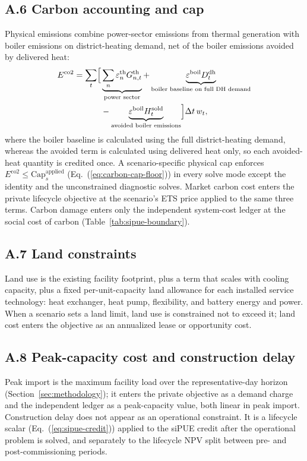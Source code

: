 \documentclass[preprint,12pt]{elsarticle}
\begin{document}
\subsection*{A.6 Carbon accounting and cap}
Physical emissions combine power-sector emissions from thermal generation with boiler emissions on district-heating demand, net of the boiler emissions avoided by delivered heat:
\begin{equation}
\begin{aligned}
E^{\text{co2}} = \sum_t \Bigl[
&\underbrace{\sum_n \varepsilon^{\text{th}}_n G^{\text{th}}_{n,t}}_{\text{power sector}}
+ \underbrace{\varepsilon^{\text{boil}} D^{\text{dh}}_t}_{\text{boiler baseline on full DH demand}} \\
&- \underbrace{\varepsilon^{\text{boil}} H^{\text{sold}}_t}_{\text{avoided boiler emissions}}
\Bigr] \Delta t\, w_t,
\end{aligned}
\label{eq:emissions}
\end{equation}
where the boiler baseline is calculated using the full district-heating demand, whereas the avoided term is calculated using delivered heat only, so each avoided-heat quantity is credited once. A scenario-specific physical cap enforces $E^{\text{co2}}\le \text{Cap}^{\text{applied}}_s$ (Eq.~(\ref{eq:carbon-cap-floor})) in every solve mode except the identity and the unconstrained diagnostic solves. Market carbon cost enters the private lifecycle objective at the scenario's ETS price applied to the same three terms. Carbon damage enters only the independent system-cost ledger at the social cost of carbon (Table~\ref{tab:sipue-boundary}).

\subsection*{A.7 Land constraints}
Land use is the existing facility footprint, plus a term that scales with cooling capacity, plus a fixed per-unit-capacity land allowance for each installed service technology: heat exchanger, heat pump, flexibility, and battery energy and power. When a scenario sets a land limit, land use is constrained not to exceed it; land cost enters the objective as an annualized lease or opportunity cost.

\subsection*{A.8 Peak-capacity cost and construction delay}
Peak import is the maximum facility load over the representative-day horizon (Section~\ref{sec:methodology}); it enters the private objective as a demand charge and the independent ledger as a peak-capacity value, both linear in peak import. Construction delay does not appear as an operational constraint. It is a lifecycle scalar (Eq.~(\ref{eq:sipue-credit})) applied to the siPUE credit after the operational problem is solved, and separately to the lifecycle NPV split between pre- and post-commissioning periods.
\end{document}
